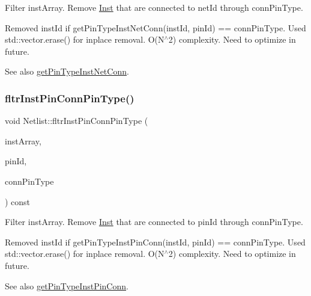 Filter inst\+Array. Remove \hyperlink{classInst}{Inst} that are connected to net\+Id through conn\+Pin\+Type. 

Removed inst\+Id if get\+Pin\+Type\+Inst\+Net\+Conn(inst\+Id, pin\+Id) == conn\+Pin\+Type. Used std\+::vector.\+erase() for inplace removal. O(\+N$^\wedge$2) complexity. Need to optimize in future.

\begin{DoxySeeAlso}{See also}
\hyperlink{classNetlist_a6bc6f9666ed8c833b967c38f2e164a1e}{get\+Pin\+Type\+Inst\+Net\+Conn}. 
\end{DoxySeeAlso}
\mbox{\label{classNetlist_a1df5b1bb963671f65331c287d4d56b2d}} 
\subsubsection{\texorpdfstring{fltr\+Inst\+Pin\+Conn\+Pin\+Type()}{fltrInstPinConnPinType()}}
{\footnotesize\ttfamily void Netlist\+::fltr\+Inst\+Pin\+Conn\+Pin\+Type (\begin{DoxyParamCaption}\item[{std\+::vector$<$ \hyperlink{type_8h_a581e8093e28e7362f2b6937296190676}{Index\+Type} $>$ \&}]{inst\+Array,  }\item[{\hyperlink{type_8h_a581e8093e28e7362f2b6937296190676}{Index\+Type}}]{pin\+Id,  }\item[{\hyperlink{type_8h_afaab50027002ecbb6c8ac27e727d1bb4}{Pin\+Type}}]{conn\+Pin\+Type }\end{DoxyParamCaption}) const}



Filter inst\+Array. Remove \hyperlink{classInst}{Inst} that are connected to pin\+Id through conn\+Pin\+Type. 

Removed inst\+Id if get\+Pin\+Type\+Inst\+Pin\+Conn(inst\+Id, pin\+Id) == conn\+Pin\+Type. Used std\+::vector.\+erase() for inplace removal. O(\+N$^\wedge$2) complexity. Need to optimize in future.

\begin{DoxySeeAlso}{See also}
\hyperlink{classNetlist_a27d477f7bd6fffd915015dbd3b3a0649}{get\+Pin\+Type\+Inst\+Pin\+Conn}. 
\end{DoxySeeAlso}
\mbox{\label{classNetlist_a6c248fed42772e11d054d8dccb720005}} 
